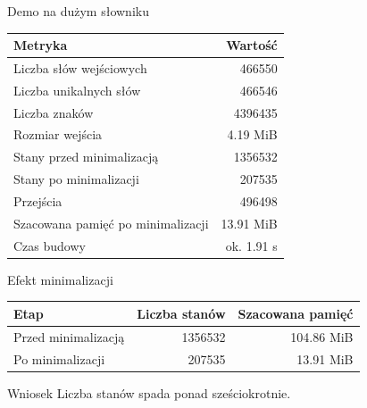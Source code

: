 \documentclass{beamer}
\begin{document}
\begin{frame}{Demo na dużym słowniku}
    \begin{table}
        \centering
        \small
        \begin{tabular}{lr}
            \hline
            Metryka                           & Wartość    \\
            \hline
            Liczba słów wejściowych           & 466550     \\
            Liczba unikalnych słów            & 466546     \\
            Liczba znaków                     & 4396435    \\
            Rozmiar wejścia                   & 4.19 MiB   \\
            Stany przed minimalizacją         & 1356532    \\
            Stany po minimalizacji            & 207535     \\
            Przejścia                         & 496498     \\
            Szacowana pamięć po minimalizacji & 13.91 MiB  \\
            Czas budowy                       & ok. 1.91 s \\
            \hline
        \end{tabular}
    \end{table}
\end{frame}

\begin{frame}{Efekt minimalizacji}
    \begin{table}
        \centering
        \small
        \begin{tabular}{lrr}
            \hline
            Etap                & Liczba stanów & Szacowana pamięć \\
            \hline
            Przed minimalizacją & 1356532       & 104.86 MiB       \\
            Po minimalizacji    & 207535        & 13.91 MiB        \\
            \hline
        \end{tabular}
    \end{table}

    \vspace{0.3cm}

    \begin{block}{Wniosek}
        Liczba stanów spada ponad sześciokrotnie.
    \end{block}
\end{frame}
\end{document}

